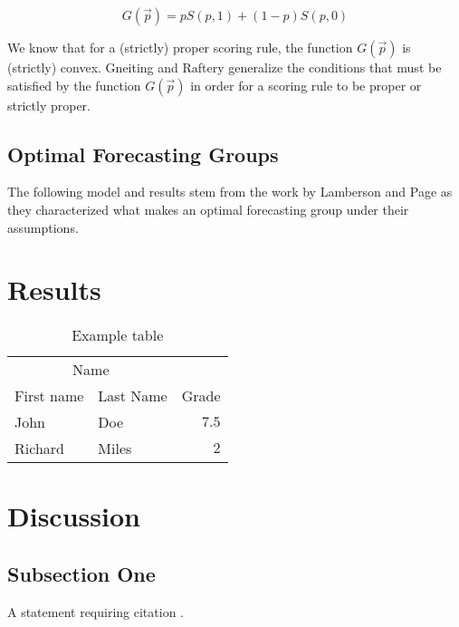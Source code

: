 \documentclass[twoside,twocolumn]{article}
\begin{document}
\begin{equation}
\label{gfunction}
G(\vec{p}) = pS(p,1) + (1-p)S(p,0)
\end{equation}

We know that for a (strictly) proper scoring rule, the function $G(\vec{p})$ is (strictly) convex. Gneiting and Raftery \cite{4} generalize the conditions that must be satisfied by the function $G(\vec{p})$ in order for a scoring rule to be proper or strictly proper.

\subsection{Optimal Forecasting Groups}

The following model and results stem from the work by Lamberson and Page \cite{3} as they characterized what makes an optimal forecasting group under their assumptions.\\
\newline





\section{Results}

\begin{table}
\caption{Example table}
\centering
\begin{tabular}{llr}
\toprule
\multicolumn{2}{c}{Name} \\
\cmidrule(r){1-2}
First name & Last Name & Grade \\
\midrule
John & Doe & $7.5$ \\
Richard & Miles & $2$ \\
\bottomrule
\end{tabular}
\end{table}

\section{Discussion}

\subsection{Subsection One}

A statement requiring citation \cite{Figueredo:2009dg}.
\blindtext %
\end{document}
